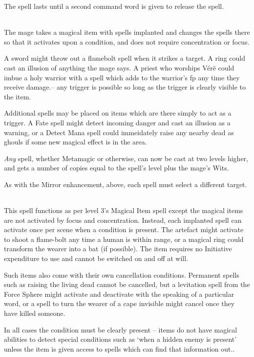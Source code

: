 \documentclass[titlepage,a4paper,openany]{book}
\begin{document}
\begin{multicols}{2}
The spell lasts until a second command word is given to release the spell.

\\
The mage takes a magical item with spells implanted and changes the spells there so that it activates upon a condition, and does not require concentration or focus.

A sword might throw out a flamebolt spell when it strikes a target.  A ring could cast an illusion of anything the mage says.  A priest who worships V\'{e}r\"{e} could imbue a holy warrior with a spell which adds to the warrior's \gls{fp} any time they receive damage.-- any trigger is possible so long as the trigger is clearly visible to the item.

Additional spells may be placed on items which are there simply to act as a trigger.  A Fate spell might detect incoming danger and cast an illusion as a warning, or a Detect Mana spell could immeidately raise any nearby dead as ghouls if some new magical effect is in the area.


\emph{Any} spell, whether Metamagic or otherwise, can now be cast at two levels higher, and gets a number of copies equal to the spell's level plus the mage's Wits.

As with the Mirror enhancement, above, each spell must select a different target.

\\
This spell functions as per level 3's Magical Item spell except the magical items are not activated by focus and concentration. Instead, each implanted spell can activate once per scene when a condition is present. The artefact might activate to shoot a flame-bolt any time a human is within range, or a magical ring could transform the wearer into a bat (if possible). The item requires no Initiative expenditure to use and cannot be switched on and off at will.

Such items also come with their own cancellation conditions. Permanent spells such as raising the living dead cannot be cancelled, but a levitation spell from the Force Sphere might activate and deactivate with the speaking of a particular word, or a spell to turn the wearer of a cape invisible might cancel once they have killed someone.

In all cases the condition must be clearly present -- items do not have magical abilities to detect special conditions such as `when a hidden enemy is present' unless the item is given access to spells which can find that information out..


\end{multicols}
\end{document}
